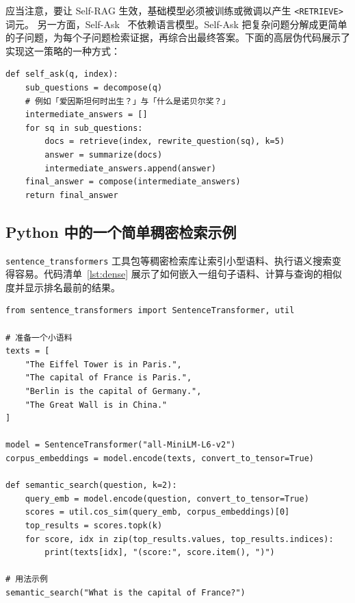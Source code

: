 应当注意，要让 Self-RAG 生效，基础模型必须被训练或微调以产生 \texttt{<RETRIEVE>} 词元。
另一方面，Self-Ask~\citep{press2022measuring} 不依赖语言模型。Self-Ask 把复杂问题分解成更简单的子问题，为每个子问题检索证据，再综合出最终答案。下面的高层伪代码展示了实现这一策略的一种方式：

\begin{listing}[!ht]
\begin{verbatim}
def self_ask(q, index):
    sub_questions = decompose(q)  
    # 例如「爱因斯坦何时出生？」与「什么是诺贝尔奖？」
    intermediate_answers = []
    for sq in sub_questions:
        docs = retrieve(index, rewrite_question(sq), k=5)
        answer = summarize(docs)
        intermediate_answers.append(answer)
    final_answer = compose(intermediate_answers)
    return final_answer
\end{verbatim}
\caption{演示 Self-Ask 的高层伪代码}
\label{lst:selfask}
\end{listing}


\subsection{Python 中的一个简单稠密检索示例}

\texttt{sentence\_transformers} 工具包等稠密检索库让索引小型语料、执行语义搜索变得容易。代码清单~\ref{lst:dense} 展示了如何嵌入一组句子语料、计算与查询的相似度并显示排名最前的结果。

\begin{listing}[!ht]
\begin{verbatim}
from sentence_transformers import SentenceTransformer, util

# 准备一个小语料
texts = [
    "The Eiffel Tower is in Paris.",
    "The capital of France is Paris.",
    "Berlin is the capital of Germany.",
    "The Great Wall is in China."
]

model = SentenceTransformer("all-MiniLM-L6-v2")
corpus_embeddings = model.encode(texts, convert_to_tensor=True)

def semantic_search(question, k=2):
    query_emb = model.encode(question, convert_to_tensor=True)
    scores = util.cos_sim(query_emb, corpus_embeddings)[0]
    top_results = scores.topk(k)
    for score, idx in zip(top_results.values, top_results.indices):
        print(texts[idx], "(score:", score.item(), ")")

# 用法示例
semantic_search("What is the capital of France?")
\end{verbatim}
\caption{Python 中的一个简单稠密检索示例}
\label{lst:dense}
\end{listing}


